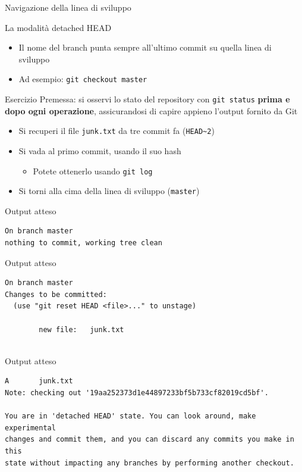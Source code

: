 \documentclass[presentation]{beamer}
\begin{document}
\begin{frame}{Navigazione della linea di sviluppo}
\begin{block}{La modalità detached HEAD}
\begin{itemize}
			\begin{itemize}
				\item Il nome del branch punta sempre all'ultimo commit su quella linea di sviluppo
				\item Ad esempio: \texttt{git checkout master}
			\end{itemize}
		\end{itemize}
	\end{block}
	\begin{block}{Esercizio}	
		Premessa: si osservi lo stato del repository con \texttt{git status} \textbf{prima e dopo ogni operazione}, assicurandosi di capire appieno l'output fornito da Git
		\begin{itemize}
			\item Si recuperi il file \texttt{junk.txt} da tre commit fa (\texttt{HEAD\textasciitilde{}2})
			\item Si vada al primo commit, usando il suo hash
			\begin{itemize}
				\item Potete ottenerlo usando \texttt{git log}
			\end{itemize}
			\item Si torni alla cima della linea di sviluppo (\texttt{master})
		\end{itemize}
	\end{block}
	\begin{block}{Output atteso}
		\begin{Verbatim}[fontsize=\scriptsize]
On branch master
nothing to commit, working tree clean
		\end{Verbatim}
	\end{block}
	\begin{block}{Output atteso}
		\begin{Verbatim}[fontsize=\scriptsize]
On branch master
Changes to be committed:
  (use "git reset HEAD <file>..." to unstage)

        new file:   junk.txt


		\end{Verbatim}
	\end{block}
	\begin{block}{Output atteso}
		\begin{Verbatim}[fontsize=\scriptsize]
A       junk.txt
Note: checking out '19aa252373d1e44897233bf5b733cf82019cd5bf'.

You are in 'detached HEAD' state. You can look around, make experimental
changes and commit them, and you can discard any commits you make in this
state without impacting any branches by performing another checkout.


\end{Verbatim}
\end{block}
\end{frame}
\end{document}
